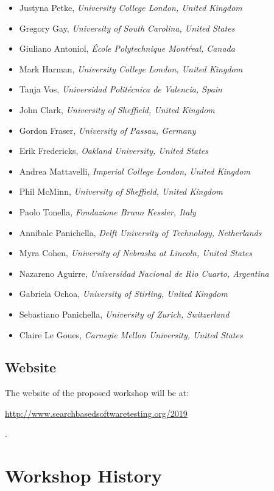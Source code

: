 \documentclass[10pt,conference]{IEEEtran}
\begin{document}
{\small
\begin{itemize}[leftmargin=*]\setlength{\itemsep}{0cm}
\item Justyna Petke, {\it University College London, United Kingdom}
\item Gregory Gay, {\it University of South Carolina, United States}
\item Giuliano Antoniol, {\it \'Ecole Polytechnique Mont\'real, Canada}
\item Mark Harman, {\it University College London, United Kingdom}
\item Tanja Vos, {\it Universidad Polit\'ecnica de Valencia, Spain}
\item John Clark, {\it University of Sheffield, United Kingdom}
\item Gordon Fraser, {\it University of Passau, Germany}
\item Erik Fredericks, {\it Oakland University, United States}
\item Andrea Mattavelli, {\it Imperial College London, United Kingdom}
\item Phil McMinn, {\it University of Sheffield, United Kingdom}
\item Paolo Tonella, {\it Fondazione Bruno Kessler, Italy}
\item Annibale Panichella, {\it Delft University of Technology, Netherlands}
\item Myra Cohen, {\it University of Nebraska at Lincoln, United States}
\item Nazareno Aguirre, {\it Universidad Nacional de Rio Cuarto, Argentina}
\item Gabriela Ochoa, {\it University of Stirling, United Kingdom}
\item Sebastiano Panichella, {\it University of Zurich, Switzerland}
\item Claire Le Goues, {\it Carnegie Mellon University, United States}
\end{itemize}
}
 
\subsection{Website}

The website of the proposed workshop will be at:\\\centerline{\url{http://www.searchbasedsoftwaretesting.org/2019}}.

\section{Workshop History}
\end{document}
